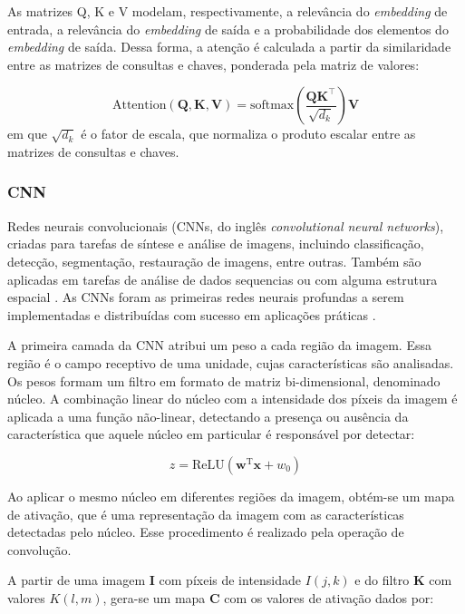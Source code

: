 As matrizes Q, K e V modelam, respectivamente, a
relevância do \textit{embedding} de entrada, a relevância do \textit{embedding}
de saída e a probabilidade dos elementos do \textit{embedding} de saída.
Dessa forma, a atenção é calculada a partir da similaridade entre as matrizes de
consultas e chaves, ponderada pela matriz de valores:

\begin{equation}
    \text{Attention}(\mathbf{Q}, \mathbf{K}, \mathbf{V}) = \text{softmax}(\frac{\mathbf{QK}^\top}{\sqrt{d_k}})\mathbf{V}
\end{equation}
em que $\sqrt{d_k}$ é o fator de escala, que normaliza o produto escalar entre
as matrizes de consultas e chaves.

\subsubsection{CNN}
Redes neurais convolucionais (CNNs, do inglês \textit{convolutional neural
networks}), criadas para tarefas de síntese e análise de imagens, incluindo
classificação, detecção, segmentação, restauração de imagens, entre outras.
Também são aplicadas em tarefas de análise de dados sequencias ou com alguma
estrutura espacial \cite{Bishop:DeepLearning24}. As CNNs foram as primeiras
redes neurais profundas a serem implementadas e distribuídas com sucesso em
aplicações práticas \cite{lecun1989}.

A primeira camada da CNN atribui um peso a cada região da imagem. Essa região é
o campo receptivo de uma unidade, cujas características são analisadas.
Os pesos formam um filtro em formato de matriz bi-dimensional, denominado
núcleo. A combinação linear do núcleo com a intensidade dos píxeis da imagem é
aplicada a uma função não-linear, detectando a presença ou ausência da
característica que aquele núcleo em particular é responsável por detectar:

\begin{equation}
    z = \text{ReLU}(\mathbf{w}^\text{T} \mathbf{x} + w_0)
\end{equation}

Ao aplicar o mesmo núcleo em diferentes regiões da imagem, obtém-se um mapa de
ativação, que é uma representação da imagem com as características detectadas
pelo núcleo. Esse procedimento é realizado pela operação de convolução.

A partir de uma imagem $\mathbf{I}$ com píxeis de intensidade $I(j, k)$
e do filtro $\mathbf{K}$ com valores $K(l, m)$, gera-se um mapa $\mathbf{C}$ com
os valores de ativação dados por:

